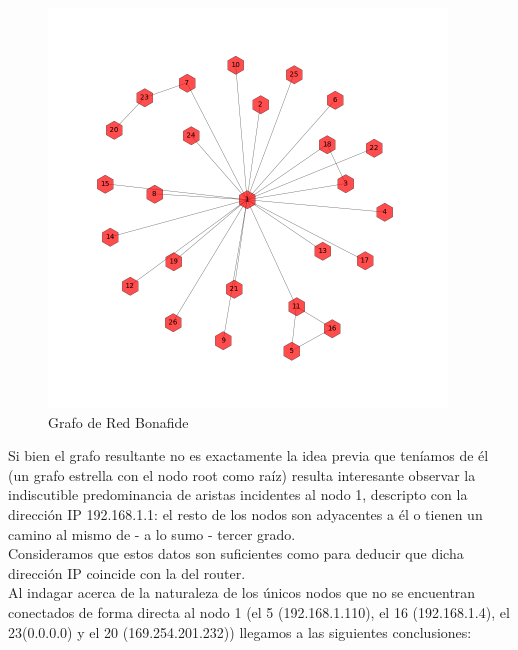 \begin{figure}[h!]
    \centering                                                       
    \includegraphics[width=300pt]{img/bonafideGraph.png}
    \caption{Grafo de Red Bonafide}
    \label{bonafide:graph}
\end{figure}
Si bien el grafo resultante no es exactamente la idea previa que teníamos de él (un grafo estrella con el nodo root como raíz) resulta interesante observar la indiscutible predominancia de aristas incidentes al nodo 1, descripto con la dirección IP 192.168.1.1: el resto de los nodos son adyacentes a él o tienen un camino al mismo de - a lo sumo - tercer grado.\\
Consideramos que estos datos son suficientes como para deducir que dicha dirección IP coincide con la del router.\\
Al indagar acerca de la naturaleza de los únicos nodos que no se encuentran conectados de forma directa al nodo 1 (el 5 (192.168.1.110), el 16 (192.168.1.4), el 23(0.0.0.0) y el 20 (169.254.201.232)) llegamos a las siguientes conclusiones: \\
